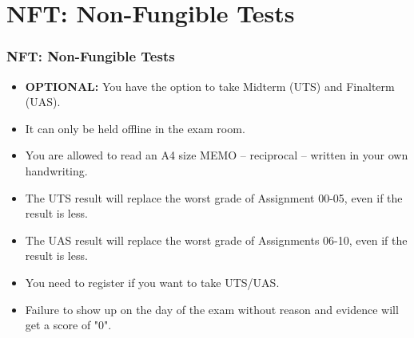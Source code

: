 \documentclass[aspectratio=169, xcolor=table, notheorems, hyperref={pdfpagelabels=false}]{beamer}
\begin{document}
\section{NFT: Non-Fungible Tests}
\begin{frame}
\frametitle{NFT: Non-Fungible Tests}
\begin{itemize}
\item \textbf{OPTIONAL:} You have the option to take Midterm (UTS) and Finalterm (UAS).
\item It can only be held offline in the exam room.
\item You are allowed to read an A4 size MEMO -- reciprocal -- written in your own handwriting.
\item The UTS result will replace the worst grade of Assignment 00-05, 
      even if the result is less.
\item The UAS result will replace the worst grade of Assignments 06-10,
      even if the result is less.
\item You need to register if you want to take UTS/UAS.
\item Failure to show up on the day of the exam without reason and evidence will get a score of "0".
\end{itemize}
\end{frame}

\end{document}
